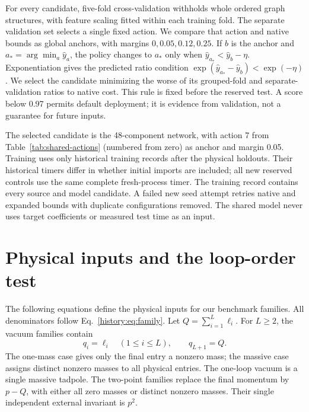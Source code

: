 For every candidate, five-fold cross-validation withholds whole ordered graph structures, with feature scaling fitted within each training fold. The separate validation set selects a single fixed action. We compare that action and native bounds as global anchors, with margins $0,0.05,0.12,0.25$. If $b$ is the anchor and $a_* =\arg\min_a\widehat y_a$, the policy changes to $a_*$ only when $\widehat y_{a_*}<\widehat y_b-\eta$. Exponentiation gives the predicted ratio condition $\exp(\widehat y_{a_*}-\widehat y_b)<\exp(-\eta)$. We select the candidate minimizing the worse of its grouped-fold and separate-validation ratios to native cost. This rule is fixed before the reserved test. A score below 0.97 permits default deployment; it is evidence from validation, not a guarantee for future inputs.

The selected candidate is the 48-component network, with action 7 from Table~\ref{tab:shared-actions} (numbered from zero) as anchor and margin 0.05. Training uses only historical training records after the physical holdouts. Their historical timers differ in whether initial imports are included; all new reserved controls use the same complete fresh-process timer. The training record contains every source and model candidate. A failed new seed attempt retries native and expanded bounds with duplicate configurations removed. The shared model never uses target coefficients or measured test time as an input.

\section{Physical inputs and the loop-order test}
\label{app:families-new}
The following equations define the physical inputs for our benchmark families. All denominators follow Eq.~\eqref{history:eq:family}. Let $Q=\sum_{i=1}^{L}\ell_i$. For $L\geq2$, the vacuum families contain
\begin{equation}
 q_i=\ell_i\quad(1\leq i\leq L),\qquad q_{L+1}=Q.
 \label{eq:vacuum-new}
\end{equation}
The one-mass case gives only the final entry a nonzero mass; the massive case assigns distinct nonzero masses to all physical entries. The one-loop vacuum is a single massive tadpole. The two-point families replace the final momentum by $p-Q$, with either all zero masses or distinct nonzero masses. Their single independent external invariant is $p^2$.

